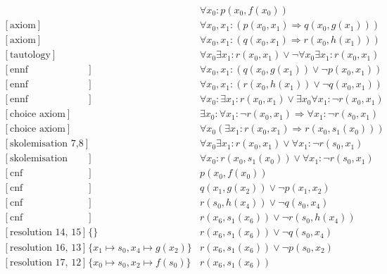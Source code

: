 \documentclass[onehalfspacing]{article}
\theoremstyle{definition}
\theoremstyle{definition}
\theoremstyle{definition}
\theoremstyle{definition}
\theoremstyle{definition}
\theoremstyle{definition}
\begin{document}
\setcounter{equation}{0}
\begin{align}
	[\text{axiom}] && \forall x_0: p(x_0,f(x_0))\\
	[\text{axiom}] && \forall x_0, x_1 : (p(x_0,x_1) \Rightarrow q(x_0,g(x_1)))\\
	[\text{axiom}] && \forall x_0, x_1 : (q(x_0,x_1) \Rightarrow r(x_0,h(x_1)))\\
	[\text{tautology}] &&\forall  x_0 \exists x_1 : r(x_0,x_1)\vee \neg\forall  x_0 \exists x_1 : r(x_0,x_1)\\
	[\text{ennf transformation 2}] && \forall x_0, x_1 : (q(x_0,g(x_1)) \vee \neg p(x_0,x_1)) \\
	[\text{ennf transformation 3}] &&\forall x_0, x_1 : (r(x_0,h(x_1)) \vee \neg q(x_0, x_1)) \\
	[\text{ennf transformation 4}] && \forall  x_0 : \exists x_1 : r(x_0,x_1)\vee \exists x_0 \forall x_1 : \neg r(x_0, x_1)\\
	[\text{choice axiom}] && \exists x_0 : \forall x_1 : \neg r(x_0, x_1) \Rightarrow \forall x_1 : \neg r(s_0,x_1)\\
	[\text{choice axiom}] &&\forall x_0(\exists x_1: r(x_0, x_1)\Rightarrow r(x_0, s_1(x_0)))\\
	[\text{skolemisation 7,8}] && \forall  x_0 \exists x_1 : r(x_0,x_1)\vee \forall x_1 : \neg r(s_0, x_1)\\
	[\text{skolemisation 9,10}] && \forall  x_0 :  r(x_0, s_1(x_0))\vee \forall x_1 : \neg r(s_0, x_1)\\
	[\text{cnf transformation 1}] && p(x_0,f(x_0))\\
	[\text{cnf transformation 5}] && q(x_1,g(x_2)) \vee \neg p(x_1, x_2)\\
	[\text{cnf transformation 6}] && r(s_0,h(x_4)) \vee \neg q(s_0, x_4)\\
	[\text{cnf transformation 11}] && r(x_6, s_1(x_6))\vee\neg r(s_0,h(x_4))\\
	[\text{resolution 14, 15}] &\{\}&r(x_6, s_1(x_6))\vee\neg q(s_0,x_4)\\
	[\text{resolution 16, 13}] &\{x_1\mapsto s_0, x_4\mapsto g(x_2)\}&r(x_6, s_1(x_6))\vee\neg p(s_0,x_2)\\
	[\text{resolution 17, 12}] &\{x_0\mapsto s_0, x_2\mapsto f(s_0)\}&r(x_6, s_1(x_6))
\end{align}
\end{document}
